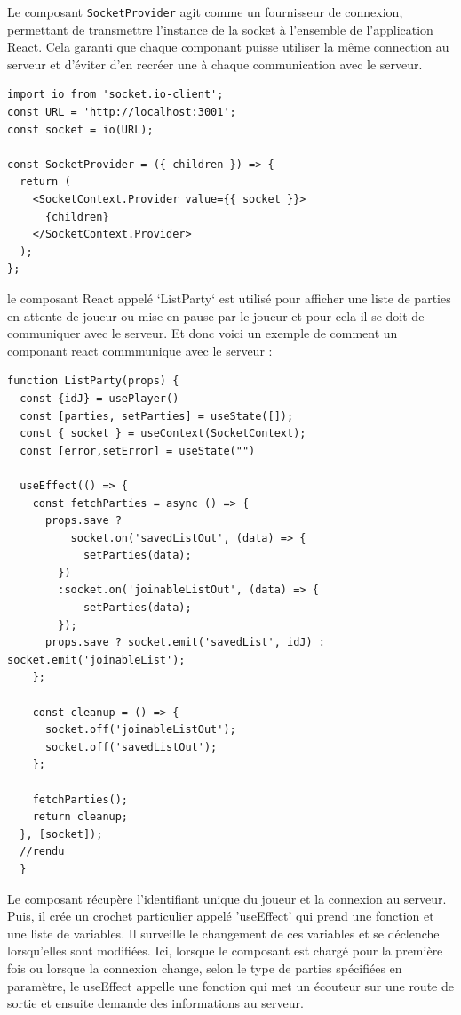\documentclass[a4paper]{article}
\begin{document}
\begin{itemize}
Le composant \texttt{SocketProvider} agit comme un fournisseur de connexion, permettant de transmettre l'instance de la socket à l'ensemble de l'application React. Cela garanti que chaque componant puisse utiliser la même connection au serveur et d'éviter d'en recréer une à chaque communication avec le serveur. 

\begin{verbatim}
import io from 'socket.io-client';
const URL = 'http://localhost:3001';
const socket = io(URL);

const SocketProvider = ({ children }) => {
  return (
    <SocketContext.Provider value={{ socket }}>
      {children}
    </SocketContext.Provider>
  );
};

\end{verbatim}

 le composant React appelé `ListParty`  est utilisé pour afficher une liste de parties en attente de joueur ou mise en pause par le joueur et pour cela il se doit de communiquer avec le serveur. Et donc voici un exemple de comment un componant react commmunique avec le serveur :
\begin{verbatim}
function ListParty(props) {
  const {idJ} = usePlayer()
  const [parties, setParties] = useState([]);
  const { socket } = useContext(SocketContext);
  const [error,setError] = useState("")

  useEffect(() => {
    const fetchParties = async () => {
      props.save ?
          socket.on('savedListOut', (data) => {
            setParties(data);
        })
        :socket.on('joinableListOut', (data) => {
            setParties(data);
        });
      props.save ? socket.emit('savedList', idJ) : socket.emit('joinableList');
    };
    
    const cleanup = () => {
      socket.off('joinableListOut');
      socket.off('savedListOut');
    };

    fetchParties();
    return cleanup;
  }, [socket]);
  //rendu
  }
\end{verbatim}

Le composant récupère l'identifiant unique du joueur et la connexion au serveur. Puis, il crée un crochet particulier appelé 'useEffect' qui prend une fonction et une liste de variables. Il surveille le changement de ces variables et se déclenche lorsqu'elles sont modifiées. Ici, lorsque le composant est chargé pour la première fois ou lorsque la connexion change, selon le type de parties spécifiées en paramètre, le useEffect appelle une fonction qui met un écouteur sur une route de sortie et ensuite demande des informations au serveur.


\end{itemize}
\end{document}
